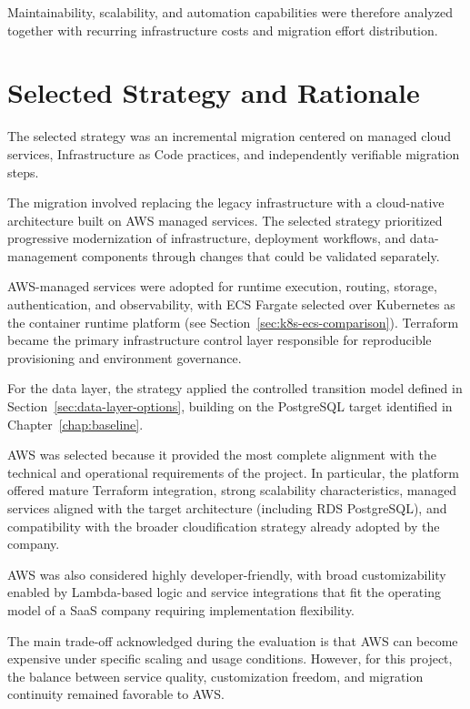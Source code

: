 Maintainability, scalability, and automation capabilities were therefore analyzed together with recurring infrastructure costs and migration effort distribution.

\section{Selected Strategy and Rationale}
The selected strategy was an incremental migration centered on managed cloud services, Infrastructure as Code practices, and independently verifiable migration steps.

The migration involved replacing the legacy infrastructure with a cloud-native architecture built on AWS managed services. The selected strategy prioritized progressive modernization of infrastructure, deployment workflows, and data-management components through changes that could be validated separately.

AWS-managed services were adopted for runtime execution, routing, storage, authentication, and observability, with ECS Fargate selected over Kubernetes as the container runtime platform (see Section~\ref{sec:k8s-ecs-comparison}). Terraform became the primary infrastructure control layer responsible for reproducible provisioning and environment governance.

For the data layer, the strategy applied the controlled transition model defined in Section~\ref{sec:data-layer-options}, building on the PostgreSQL target identified in Chapter~\ref{chap:baseline}.

AWS was selected because it provided the most complete alignment with the technical and operational requirements of the project. In particular, the platform offered mature Terraform integration, strong scalability characteristics, managed services aligned with the target architecture (including RDS PostgreSQL), and compatibility with the broader cloudification strategy already adopted by the company.

AWS was also considered highly developer-friendly, with broad customizability enabled by Lambda-based logic and service integrations that fit the operating model of a SaaS company requiring implementation flexibility.

The main trade-off acknowledged during the evaluation is that AWS can become expensive under specific scaling and usage conditions. However, for this project, the balance between service quality, customization freedom, and migration continuity remained favorable to AWS.


